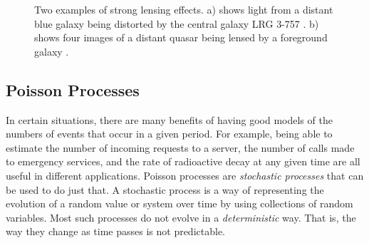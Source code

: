 \documentclass[a4paper,11pt]{article}
\begin{document}
\begin{figure}
\centering
{}
\qquad
{}
\caption{Two examples of strong lensing effects. a) shows light from
a distant blue galaxy being distorted by the central galaxy LRG 3-757
\cite{einsteinring}. b) shows four images of a distant quasar being lensed by a
foreground galaxy \cite{eincross}.}
\label{fig:stronglens}
\end{figure}
\subsection{Poisson Processes}
\label{sec-2-2}

In certain situations, there are many benefits of having good models of the
numbers of events that occur in a given period. For example, being able to
estimate the number of incoming requests to a server, the number of calls made
to emergency services, and the rate of radioactive decay at any given time are
all useful in different applications. Poisson processes are \emph{stochastic
processes} that can be used to do just that. A stochastic process is a way of
representing the evolution of a random value or system over time by using
collections of random variables. Most such processes do not evolve in a
\emph{deterministic} way. That is, the way they change as time passes is not
predictable.
\end{document}

